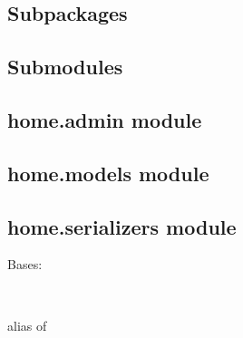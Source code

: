 \documentclass[letterpaper,10pt,english]{sphinxmanual}
\begin{document}
\subsection{Subpackages}
\label{modules/home:subpackages}

\subsection{Submodules}
\label{modules/home:submodules}

\subsection{home.admin module}
\label{modules/home:home-admin-module}\label{modules/home:module-home.admin}

\subsection{home.models module}
\label{modules/home:module-home.models}\label{modules/home:home-models-module}

\subsection{home.serializers module}
\label{modules/home:home-serializers-module}\label{modules/home:module-home.serializers}

\begin{fulllineitems}
\label{modules/home:home.serializers.UserSerializer}
Bases: 

\begin{fulllineitems}
\label{modules/home:home.serializers.UserSerializer.Meta}~

\begin{fulllineitems}
\label{modules/home:home.serializers.UserSerializer.Meta.fields}
\end{fulllineitems}


\begin{fulllineitems}
\label{modules/home:home.serializers.UserSerializer.Meta.model}
alias of 

\end{fulllineitems}


\end{fulllineitems}


\end{fulllineitems}
\end{document}
